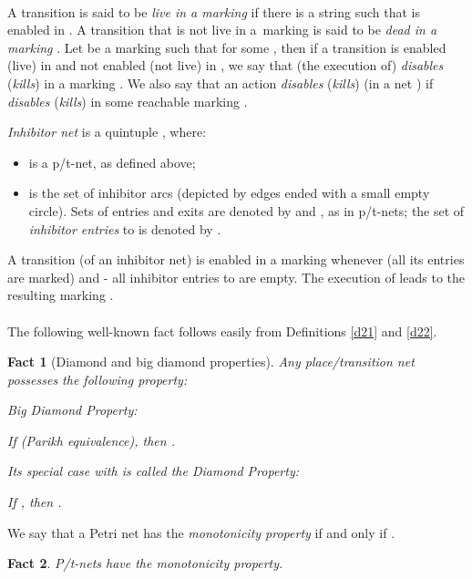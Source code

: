 \documentclass[a4paper]{llncs}
\newtheorem{fact}{Fact}
\begin{document}
\mbox{ }\\
A transition  is said to be \emph{live in a marking } if there is a string  such that  is enabled in . A transition  that is not live in a~marking  is said to be \emph{dead in a marking }. Let  be a marking such that  for some , then if a transition  is enabled (live) in  and not enabled (not live) in , we say that (the execution of)  \emph{disables} (\emph{kills})  in a marking . We also say that an action   \emph{disables} (\emph{kills})  (in a net ) if  \emph{disables} (\emph{kills})  in some reachable marking .
\\ 
\begin{definition} 
\label{d23}
\emph{Inhibitor net}  is a quintuple , where:
\begin{itemize}
\item  is a p/t-net, as defined above;
\item  is the set of inhibitor arcs (depicted by edges ended with a small empty circle). Sets of entries and exits are denoted by  and , as in p/t-nets; the set of \emph{inhibitor entries} to  is denoted by .
\end{itemize}
\end{definition}
A transition  (of an inhibitor net) is enabled in a marking  whenever  (all its entries are marked) and   - all inhibitor entries to  are empty. The execution of  leads to the resulting marking .
\\ \\
The following well-known fact follows easily from Definitions \ref{d21} and \ref{d22}.
\begin{fact} [Diamond and big diamond properties]
\label{f24}
Any place/transition net possesses the following property:

\emph{Big Diamond Property}:

If  (Parikh equivalence), then .

Its special case with  is called the \emph{Diamond Property}:

If , then .
\end{fact}

\begin{definition}
\label{d261}
We say that a Petri net  has the \emph{monotonicity property} if and only if .
\end{definition}

\begin{fact}
\label{f27}
P/t-nets have the monotonicity property.
\end{fact}
\end{document}
